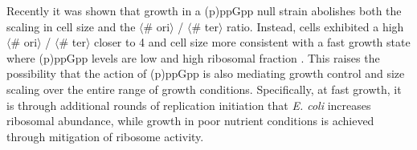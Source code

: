 Recently it was shown that growth in a (p)ppGpp null strain abolishes both the
scaling in cell size and the $\langle$\# ori$\rangle$ / $\langle$\# ter$\rangle$
ratio. Instead, cells exhibited a high $\langle$\# ori$\rangle$ / $\langle$\#
ter$\rangle$ closer to 4 and cell size more consistent with a fast growth state
where (p)ppGpp levels are low \citep{fernandezcoll2020} and high ribosomal
fraction \citep{zhu2019}. This raises the possibility that the action of
(p)ppGpp is also mediating growth control and size scaling over the entire range
of growth conditions. Specifically, at fast growth, it is through additional
rounds of replication initiation that \textit{E. coli} increases ribosomal
abundance,  while growth in poor nutrient conditions is achieved through
mitigation of ribosome activity.




%
